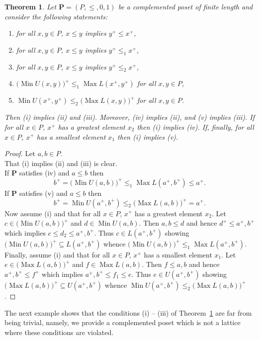 \documentclass[12pt]{article}
\DeclareMathOperator{\Max}{Max}
\DeclareMathOperator{\Min}{Min}
\newtheorem{theorem}{Theorem}[section]
\begin{document}
\begin{theorem}\label{th2}
Let $\mathbf P=(P,\le,0,1)$ be a complemented poset of finite length and consider the following statements:
\begin{enumerate}[{\rm(i)}]
\item for all $x,y\in P$, $x\le y$ implies $y^+\le x^+$,
\item for all $x,y\in P$, $x\le y$ implies $y^+\le_1x^+$,
\item for all $x,y\in P$, $x\le y$ implies $y^+\le_2x^+$,
\item $\big(\Min U(x,y)\big)^+\le_1\Max L(x^+,y^+)$ for all $x,y\in P$,
\item $\Min U(x^+,y^+)\le_2\big(\Max L(x,y)\big)^+$ for all $x,y\in P$.
\end{enumerate}
Then {\rm(i)} implies {\rm(ii)} and {\rm(iii)}. Moreover, {\rm(iv)} implies {\rm(ii)}, and {\rm(v)} implies {\rm(iii)}. If for all $x\in P$, $x^+$ has a greatest element $x_2$ then {\rm(i)} implies {\rm(iv)}. If, finally, for all $x\in P$, $x^+$ has a smallest element $x_1$ then {\rm(i)} implies {\rm(v)}.
\end{theorem}

\begin{proof}
Let $a,b\in P$. \\
That (i) implies (ii) and (iii) is clear. \\
If $\mathbf P$ satisfies (iv) and $a\le b$ then
\[
b^+=\big(\Min U(a,b)\big)^+\le_1\Max L(a^+,b^+)\le a^+.
\]
If $\mathbf P$ satisfies (v) and $a\le b$ then
\[
b^+=\Min U(a^+,b^+)\le_2\big(\Max L(a,b)\big)^+=a^+.
\]
Now assume (i) and that for all $x\in P$, $x^+$ has a greatest element $x_2$. Let $c\in\big(\Min U(a,b)\big)^+$ and $d\in\Min U(a,b)$. Then $a,b\le d$ and hence $d^+\le a^+,b^+$ which implies $c\le d_2\le a^+,b^+$. Thus $c\in L(a^+,b^+)$ showing $\big(\Min U(a,b)\big)^+\subseteq L(a^+,b^+)$ whence $\big(\Min U(a,b)\big)^+\le_1\Max L(a^+,b^+)$. \\
Finally, assume (i) and that for all $x\in P$, $x^+$ has a smallest element $x_1$. Let $e\in\big(\Max L(a,b)\big)^+$ and $f\in\Max L(a,b)$. Then $f\le a,b$ and hence $a^+,b^+\le f^+$ which implies $a^+,b^+\le f_1\le e$. Thus $e\in U(a^+,b^+)$ showing $\big(\Max L(a,b)\big)^+\subseteq U(a^+,b^+)$ whence $\Min U(a^+,b^+)\le_2\big(\Max L(a,b)\big)^+$.
\end{proof}

The next example shows that the conditions (i) -- (iii) of Theorem~\ref{th2} are far from being trivial, namely, we provide a complemented poset which is not a lattice where these conditions are violated.
\end{document}
